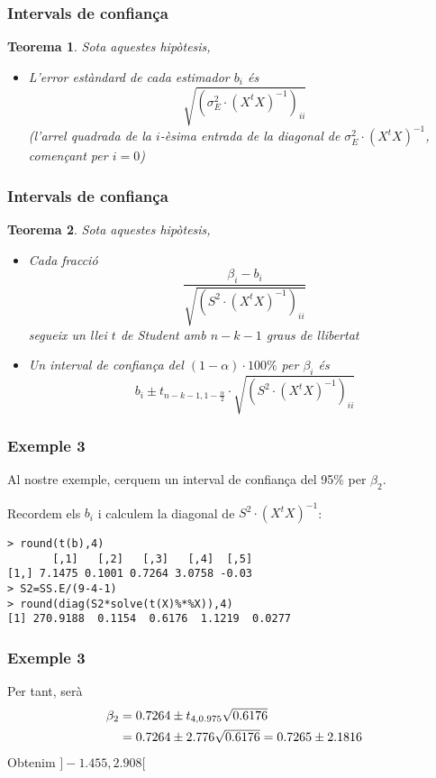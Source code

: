 \documentclass[12pt,t]{beamer}
\theoremstyle{plain}
\newtheorem{teorema}{Teorema}
\theoremstyle{definition}
\begin{document}




\begin{frame}
\frametitle{Intervals de confiança}
\begin{teorema}
Sota aquestes hipòtesis, 
\begin{itemize}
\item L'error estàndard de cada estimador $b_i$ és 
$$
\sqrt{(\sigma_E^2\cdot (X^t X)^{-1})_{ii}}
$$
(l'arrel quadrada de la $i$-èsima entrada de la diagonal de $\sigma_E^2\cdot (X^t X)^{-1}$, començant per $i=0$)
\end{itemize}
\end{teorema}
\end{frame}


\begin{frame}
\frametitle{Intervals de confiança}
\begin{teorema}
Sota aquestes hipòtesis, 
\begin{itemize}
\item Cada fracció 
$$
\frac{\beta_i-b_i}{\sqrt{(S^2\cdot (X^t X)^{-1})_{ii}}}
$$
segueix un llei $t$ de Student amb $n-k-1$ graus de llibertat
\medskip

\item Un interval de confiança del $(1-\alpha)\cdot 100\%$ per $\beta_i$ és
$$
b_i\pm t_{n-k-1,1-\frac{\alpha}{2}}\cdot \sqrt{(S^2\cdot (X^t X)^{-1})_{ii}}
$$
\end{itemize}
\end{teorema}
\end{frame}


\begin{frame}[fragile]
\frametitle{Exemple 3}
Al nostre exemple, cerquem un interval de confiança del 95\% per $\beta_2$.
\medskip

Recordem els $b_i$ i calculem la diagonal de $S^2\cdot (X^t X)^{-1}$:
\begin{verbatim}
> round(t(b),4)
       [,1]   [,2]   [,3]   [,4]  [,5]
[1,] 7.1475 0.1001 0.7264 3.0758 -0.03
> S2=SS.E/(9-4-1)
> round(diag(S2*solve(t(X)%*%X)),4)
[1] 270.9188  0.1154  0.6176  1.1219  0.0277
\end{verbatim}
\end{frame}


\begin{frame}
\frametitle{Exemple 3}
Per tant, serà
$$
\begin{array}{l}
\beta_2=0.7264\pm t_{4,0.975}\sqrt{0.6176}\\[1ex]
\hphantom{\beta_2} =0.7264\pm 2.776\sqrt{0.6176}=0.7265\pm 2.1816
\end{array}
$$
Obtenim $]-1.455,2.908[$
\end{frame}
\end{document}
